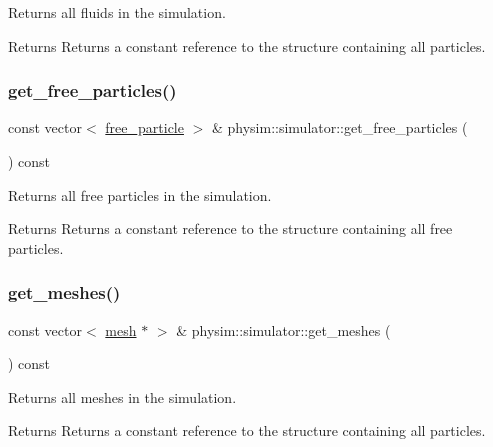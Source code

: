 Returns all fluids in the simulation. 

\begin{DoxyReturn}{Returns}
Returns a constant reference to the structure containing all particles. 
\end{DoxyReturn}
\mbox{\label{classphysim_1_1simulator_a8d030b30ee12814ea6a20faa7e61bd8c}} 
\subsubsection{\texorpdfstring{get\+\_\+free\+\_\+particles()}{get\_free\_particles()}}
{\footnotesize\ttfamily const vector$<$ \hyperlink{classphysim_1_1particles_1_1free__particle}{free\+\_\+particle} $>$ \& physim\+::simulator\+::get\+\_\+free\+\_\+particles (\begin{DoxyParamCaption}{ }\end{DoxyParamCaption}) const}



Returns all free particles in the simulation. 

\begin{DoxyReturn}{Returns}
Returns a constant reference to the structure containing all free particles. 
\end{DoxyReturn}
\mbox{\label{classphysim_1_1simulator_a515217acebf6d4ae784af02a60bede00}} 
\subsubsection{\texorpdfstring{get\+\_\+meshes()}{get\_meshes()}}
{\footnotesize\ttfamily const vector$<$ \hyperlink{classphysim_1_1meshes_1_1mesh}{mesh} $\ast$ $>$ \& physim\+::simulator\+::get\+\_\+meshes (\begin{DoxyParamCaption}{ }\end{DoxyParamCaption}) const}



Returns all meshes in the simulation. 

\begin{DoxyReturn}{Returns}
Returns a constant reference to the structure containing all particles. 
\end{DoxyReturn}
\mbox{\label{classphysim_1_1simulator_acf45d34a15b06437858e3324af1a559c}} 
